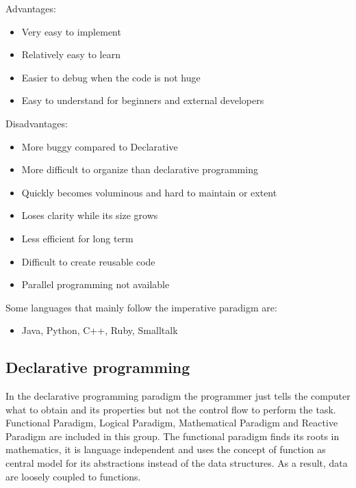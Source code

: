 Advantages:
\begin{itemize}[noitemsep]
    \item Very easy to implement
    \item Relatively easy to learn
    \item Easier to debug when the code is not huge
    \item Easy to understand for beginners and external developers 
\end{itemize}

Disadvantages:
\begin{itemize}[noitemsep]
    \item More buggy compared to Declarative
    \item More difficult to organize than declarative programming
    \item Quickly becomes voluminous and hard to maintain or extent
    \item Loses clarity while its size grows
    \item Less efficient for long term
    \item Difficult to create reusable code
    \item Parallel programming not available
\end{itemize}

Some languages that mainly follow the imperative paradigm are:
\begin{itemize}
    \item Java, Python, C++, Ruby, Smalltalk
\end{itemize}
        
        \vspace{-.5cm}
        \subsection*{Declarative programming}
In the declarative programming paradigm the programmer just tells the computer what to obtain and its properties but not the control flow to perform the task.
Functional Paradigm, Logical Paradigm, Mathematical Paradigm and Reactive Paradigm are included in this group.
The functional paradigm finds its roots in mathematics, it is language independent and
uses the concept of function as central model for its abstractions instead of the data structures.
As a result, data are loosely coupled to functions.

